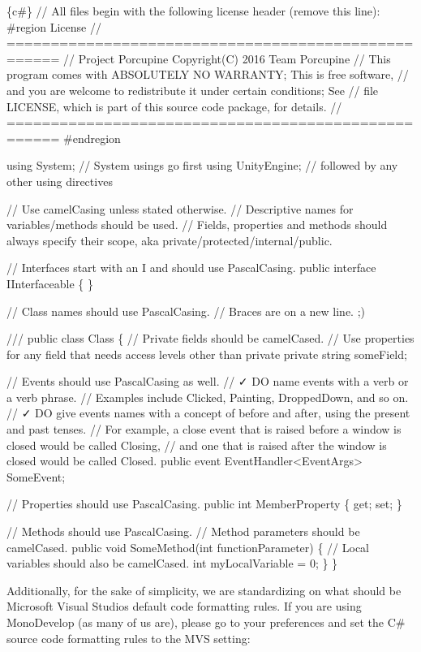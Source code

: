 \begin{DoxyCode}
\{c#\}
// All files begin with the following license header (remove this line):
#region License
// ====================================================
// Project Porcupine Copyright(C) 2016 Team Porcupine
// This program comes with ABSOLUTELY NO WARRANTY; This is free software,
// and you are welcome to redistribute it under certain conditions; See
// file LICENSE, which is part of this source code package, for details.
// ====================================================
#endregion

using System; // System usings go first
using UnityEngine; // followed by any other using directives

// Use camelCasing unless stated otherwise.
// Descriptive names for variables/methods should be used.
// Fields, properties and methods should always specify their scope, aka private/protected/internal/public.

// Interfaces start with an I and should use PascalCasing.
public interface IInterfaceable
\{
\}

// Class names should use PascalCasing.
// Braces are on a new line. ;)

///
public class Class
\{
    // Private fields should be camelCased.
    // Use properties for any field that needs access levels other than private
    private string someField;

    // Events should use PascalCasing as well.
    // ✓ DO name events with a verb or a verb phrase.
    // Examples include Clicked, Painting, DroppedDown, and so on.
    // ✓ DO give events names with a concept of before and after, using the present and past tenses.
    // For example, a close event that is raised before a window is closed would be called Closing,
    // and one that is raised after the window is closed would be called Closed.
    public event EventHandler<EventArgs> SomeEvent;

    // Properties should use PascalCasing.
    public int MemberProperty \{ get; set; \}

    // Methods should use PascalCasing.
    // Method parameters should be camelCased.
    public void SomeMethod(int functionParameter)
    \{
        // Local variables should also be camelCased.
        int myLocalVariable = 0;
    \}
\}
\end{DoxyCode}


Additionally, for the sake of simplicity, we are standardizing on what should be Microsoft Visual Studio\textquotesingle{}s default code formatting rules. If you are using Mono\+Develop (as many of us are), please go to your preferences and set the C\# source code formatting rules to the M\+VS setting\+:


